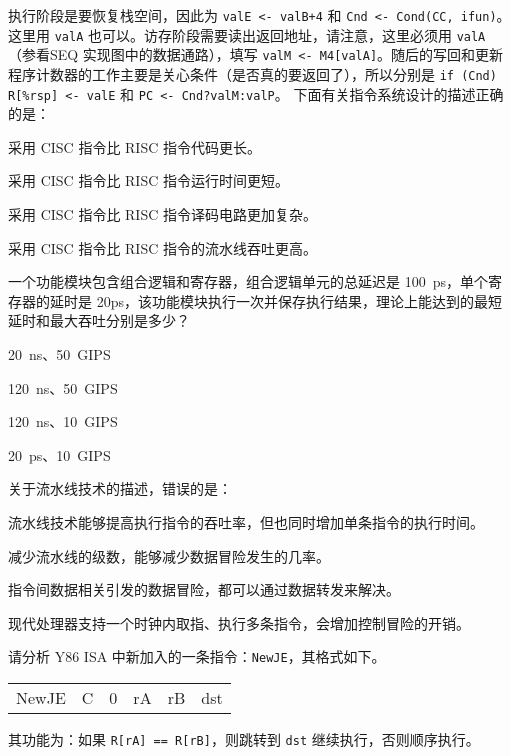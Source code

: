 \begin{problems}
        执行阶段是要恢复栈空间，因此为 \verb|valE <- valB+4| 和 \verb|Cnd <- Cond(CC, ifun)|。这里用 \verb|valA| 也可以。访存阶段需要读出返回地址，请注意，这里必须用 \verb|valA|（参看SEQ 实现图中的数据通路），填写 \verb|valM <- M4[valA]|。随后的写回和更新程序计数器的工作主要是关心条件（是否真的要返回了），所以分别是 \verb|if (Cnd) R[%rsp] <- valE| 和 \verb|PC <- Cnd?valM:valP|。
         下面有关指令系统设计的描述正确的是：
        \begin{choices}
            \item 采用 CISC 指令比 RISC 指令代码更长。
            \item 采用 CISC 指令比 RISC 指令运行时间更短。
            \item 采用 CISC 指令比 RISC 指令译码电路更加复杂。
            \item 采用 CISC 指令比 RISC 指令的流水线吞吐更高。
        \end{choices}
         一个功能模块包含组合逻辑和寄存器，组合逻辑单元的总延迟是 \SI{100}{ps}，单个寄存器的延时是 20ps，该功能模块执行一次并保存执行结果，理论上能达到的最短延时和最大吞吐分别是多少？
        \begin{choices}
            \item \SI{20}{ns}、\SI{50}{GIPS}
            \item \SI{120}{ns}、\SI{50}{GIPS}
            \item \SI{120}{ns}、\SI{10}{GIPS}
            \item \SI{20}{ps}、\SI{10}{GIPS}
        \end{choices}
         关于流水线技术的描述，错误的是：
        \begin{choices}
            \item 流水线技术能够提高执行指令的吞吐率，但也同时增加单条指令的执行时间。
            \item 减少流水线的级数，能够减少数据冒险发生的几率。
            \item 指令间数据相关引发的数据冒险，都可以通过数据转发来解决。
            \item 现代处理器支持一个时钟内取指、执行多条指令，会增加控制冒险的开销。
        \end{choices}
         请分析 Y86 ISA 中新加入的一条指令：\verb|NewJE|，其格式如下。
        \begin{table}[H]
            \centering
            \begin{tabular}{c|c|c|c|c|c|}
                \cline{2-6}
                NewJE & C & 0 & rA & rB & dst \\ \cline{2-6} 
            \end{tabular}
        \end{table}
        其功能为：如果 \verb|R[rA] == R[rB]|，则跳转到 \verb|dst| 继续执行，否则顺序执行。


\end{problems}

